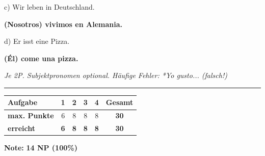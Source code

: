 \documentclass[11pt, a4paper]{article}
\newcommand{\lsg}[1]{\textcolor{loesung}{\textbf{#1}}}
\begin{document}
\vspace{1em}

\noindent
c) Wir leben in Deutschland.

\lsg{(Nosotros) vivimos en Alemania.}

\vspace{1em}

\noindent
d) Er isst eine Pizza.

\lsg{(Él) come una pizza.}

\textit{\textcolor{grau}{Je 2P. Subjektpronomen optional. Häufige Fehler: *Yo gusto... (falsch!)}}


\vspace{25pt}
\hrule
\vspace{10pt}

\noindent
\begin{tabularx}{\textwidth}{|X|c|c|c|c||c|}
\hline
\textbf{Aufgabe} & 1 & 2 & 3 & 4 & \textbf{Gesamt} \\
\hline
\textbf{max. Punkte} & 6 & 8 & 8 & 8 & \textbf{30} \\
\hline
\textbf{erreicht} & \lsg{6} & \lsg{8} & \lsg{8} & \lsg{8} & \lsg{30} \\[0.8em]
\hline
\end{tabularx}

\vspace{10pt}

\begin{flushright}
\textbf{Note:} \lsg{14 NP (100\%)}
\end{flushright}
\end{document}
